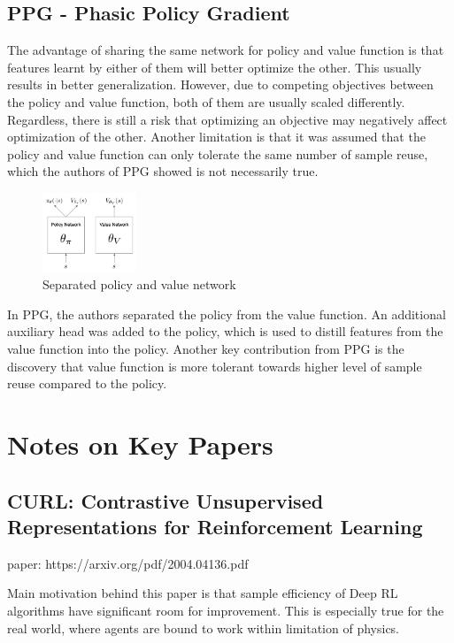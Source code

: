 \documentclass[11pt]{article} %
\begin{document}
\subsection{PPG - Phasic Policy Gradient}
The advantage of sharing the same network for policy and value function is that features learnt by either of them will better optimize the other. This usually results in better generalization. However, due to competing objectives between the policy and value function, both of them are usually scaled differently. Regardless, there is still a risk that optimizing an objective may negatively affect optimization of the other. Another limitation is that it was assumed that the policy and value function can only tolerate the same number of sample reuse, which the authors of PPG showed is not necessarily true.

\begin{figure}
    \centering
    \includegraphics[width=0.25\textwidth]{images/ppg.png}
    \caption{Separated policy and value network}
\end{figure}

In PPG, the authors separated the policy from the value function. An additional auxiliary head was added to the policy, which is used to distill features from the value function into the policy. Another key contribution from PPG is the discovery that value function is more tolerant towards higher level of sample reuse compared to the policy. 

\section{Notes on Key Papers}
\subsection{CURL: Contrastive Unsupervised Representations for Reinforcement Learning}
paper: https://arxiv.org/pdf/2004.04136.pdf

Main motivation behind this paper is that sample efficiency of Deep RL algorithms have significant room for improvement. This is especially true for the real world, where agents are bound to work within limitation of physics.
\end{document}
